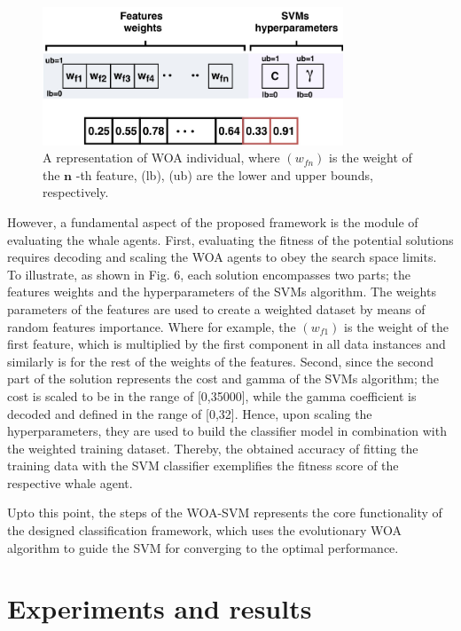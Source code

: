 \documentclass{article}
\begin{document}
\begin{figure}[htbp]
\centering
\includegraphics[width=0.8\textwidth]{images/7746e4b64e7a5067b8e62ecd8847e1dd076ae501b3346b678df26ce7efb7aa2e.jpg}
\caption{A representation of WOA individual, where $(w_{f n})$ is the weight of the $\mathbf{n}$ -th feature, (lb), (ub) are the lower and upper bounds, respectively.}
\end{figure}


However, a fundamental aspect of the proposed framework is the module of evaluating the whale agents. First, evaluating the fitness of the potential solutions requires decoding and scaling the WOA agents to obey the search space limits. To illustrate, as shown in Fig. 6, each solution encompasses two parts; the features weights and the hyperparameters of the SVMs algorithm. The weights parameters of the features are used to create a weighted dataset by means of random features importance. Where for example, the $(w_{f1})$ is the weight of the first feature, which is multiplied by the first component in all data instances and similarly is for the rest of the weights of the features. Second, since the second part of the solution represents the cost and gamma of the SVMs algorithm; the cost is scaled to be in the range of [0,35000], while the gamma coefficient is decoded and defined in the range of [0,32]. Hence, upon scaling the hyperparameters, they are used to build the classifier model in combination with the weighted training dataset. Thereby, the obtained accuracy of fitting the training data with the SVM classifier exemplifies the fitness score of the respective whale agent.


Upto this point, the steps of the WOA-SVM represents the core functionality of the designed classification framework, which uses the evolutionary WOA algorithm to guide the SVM for converging to the optimal performance.


\section{Experiments and results}
\end{document}
